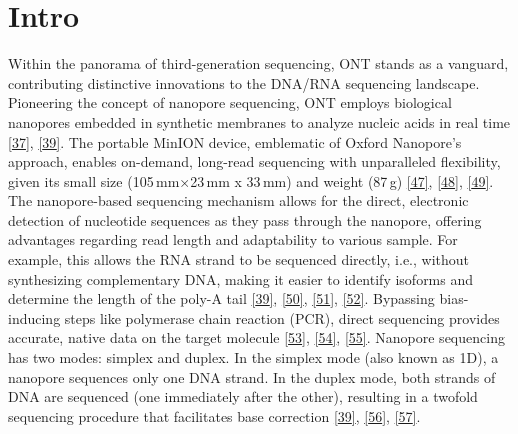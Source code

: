 \documentclass[
  letterpaper,
  DIV=11,
  numbers=noendperiod]{scrreprt}
\begin{document}
\section{Intro}\label{intro}

Within the panorama of third-generation sequencing, ONT stands as a
vanguard, contributing distinctive innovations to the DNA/RNA sequencing
landscape. Pioneering the concept of nanopore sequencing, ONT employs
biological nanopores embedded in synthetic membranes to analyze nucleic
acids in real time
\href{https://www.sciencedirect.com/science/article/pii/S1872497324001522\#bib37}{{[}37{]}},
\href{https://www.sciencedirect.com/science/article/pii/S1872497324001522\#bib39}{{[}39{]}}.
The portable MinION device, emblematic of Oxford Nanopore's approach,
enables on-demand, long-read sequencing with unparalleled flexibility,
given its small size (105\,mm×23\,mm x 33\,mm) and weight (87\,g)
\href{https://www.sciencedirect.com/science/article/pii/S1872497324001522\#bib47}{{[}47{]}},
\href{https://www.sciencedirect.com/science/article/pii/S1872497324001522\#bib48}{{[}48{]}},
\href{https://www.sciencedirect.com/science/article/pii/S1872497324001522\#bib49}{{[}49{]}}.
The nanopore-based sequencing mechanism allows for the direct,
electronic detection of nucleotide sequences as they pass through the
nanopore, offering advantages regarding read length and adaptability to
various sample. For example, this allows the RNA strand to be sequenced
directly, i.e., without synthesizing complementary DNA, making it easier
to identify isoforms and determine the length of the poly-A tail
\href{https://www.sciencedirect.com/science/article/pii/S1872497324001522\#bib39}{{[}39{]}},
\href{https://www.sciencedirect.com/science/article/pii/S1872497324001522\#bib50}{{[}50{]}},
\href{https://www.sciencedirect.com/science/article/pii/S1872497324001522\#bib51}{{[}51{]}},
\href{https://www.sciencedirect.com/science/article/pii/S1872497324001522\#bib52}{{[}52{]}}.
Bypassing bias-inducing steps like polymerase chain reaction (PCR),
direct sequencing provides accurate, native data on the target molecule
\href{https://www.sciencedirect.com/science/article/pii/S1872497324001522\#bib53}{{[}53{]}},
\href{https://www.sciencedirect.com/science/article/pii/S1872497324001522\#bib54}{{[}54{]}},
\href{https://www.sciencedirect.com/science/article/pii/S1872497324001522\#bib55}{{[}55{]}}.
Nanopore sequencing has two modes: simplex and duplex. In the simplex
mode (also known as 1D), a nanopore sequences only one DNA strand. In
the duplex mode, both strands of DNA are sequenced (one immediately
after the other), resulting in a twofold sequencing procedure that
facilitates base correction
\href{https://www.sciencedirect.com/science/article/pii/S1872497324001522\#bib39}{{[}39{]}},
\href{https://www.sciencedirect.com/science/article/pii/S1872497324001522\#bib56}{{[}56{]}},
\href{https://www.sciencedirect.com/science/article/pii/S1872497324001522\#bib57}{{[}57{]}}.
\end{document}
